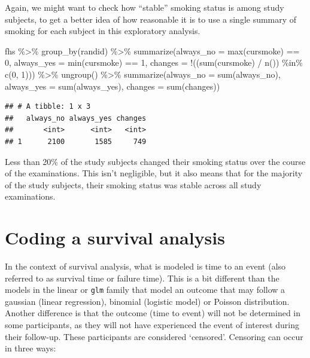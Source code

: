 \documentclass[
]{book}
\newenvironment{Shaded}{\begin{snugshade}}{\end{snugshade}}
\newcommand{\AttributeTok}[1]{\textcolor[rgb]{0.77,0.63,0.00}{#1}}
\newcommand{\DecValTok}[1]{\textcolor[rgb]{0.00,0.00,0.81}{#1}}
\newcommand{\FunctionTok}[1]{\textcolor[rgb]{0.00,0.00,0.00}{#1}}
\newcommand{\NormalTok}[1]{#1}
\newcommand{\SpecialCharTok}[1]{\textcolor[rgb]{0.00,0.00,0.00}{#1}}
\begin{document}
Again, we might want to check how ``stable'' smoking status is among study subjects, to get a better idea of how reasonable it is to use a single summary of smoking for each subject in this exploratory analysis.

\begin{Shaded}
\begin{Highlighting}[]
\NormalTok{fhs }\SpecialCharTok{\%\textgreater{}\%} 
  \FunctionTok{group\_by}\NormalTok{(randid) }\SpecialCharTok{\%\textgreater{}\%} 
  \FunctionTok{summarize}\NormalTok{(}\AttributeTok{always\_no =} \FunctionTok{max}\NormalTok{(cursmoke) }\SpecialCharTok{==} \DecValTok{0}\NormalTok{, }
            \AttributeTok{always\_yes =} \FunctionTok{min}\NormalTok{(cursmoke) }\SpecialCharTok{==} \DecValTok{1}\NormalTok{, }
            \AttributeTok{changes =} \SpecialCharTok{!}\NormalTok{((}\FunctionTok{sum}\NormalTok{(cursmoke) }\SpecialCharTok{/} \FunctionTok{n}\NormalTok{()) }\SpecialCharTok{\%in\%} \FunctionTok{c}\NormalTok{(}\DecValTok{0}\NormalTok{, }\DecValTok{1}\NormalTok{))) }\SpecialCharTok{\%\textgreater{}\%} 
  \FunctionTok{ungroup}\NormalTok{() }\SpecialCharTok{\%\textgreater{}\%} 
  \FunctionTok{summarize}\NormalTok{(}\AttributeTok{always\_no =} \FunctionTok{sum}\NormalTok{(always\_no), }
            \AttributeTok{always\_yes =} \FunctionTok{sum}\NormalTok{(always\_yes), }
            \AttributeTok{changes =} \FunctionTok{sum}\NormalTok{(changes))}
\end{Highlighting}
\end{Shaded}

\begin{verbatim}
## # A tibble: 1 x 3
##   always_no always_yes changes
##       <int>      <int>   <int>
## 1      2100       1585     749
\end{verbatim}

Less than 20\% of the study subjects changed their smoking status over the course of the examinations. This isn't negligible, but it also means that for the majority of the study subjects, their smoking status was stable across all study examinations.

\hypertarget{coding-a-survival-analysis}{%
\section{Coding a survival analysis}\label{coding-a-survival-analysis}}

In the context of survival analysis, what is modeled is time to an event (also referred to as survival time or failure time). This is a bit different than the models in the linear or \texttt{glm} family that model an outcome that may follow a gaussian (linear regression), binomial (logistic model) or Poisson distribution. Another difference is that the outcome (time to event) will not be determined in some participants, as they will not have experienced the event of interest during their follow-up. These participants are considered `censored'. Censoring can occur in three ways:
\end{document}
